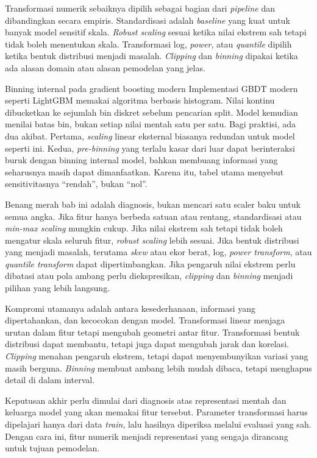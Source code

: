 Transformasi numerik sebaiknya dipilih sebagai bagian dari \emph{pipeline} dan dibandingkan secara empiris. Standardisasi adalah \emph{baseline} yang kuat untuk banyak model sensitif skala. \emph{Robust scaling} sesuai ketika nilai ekstrem sah tetapi tidak boleh menentukan skala. Transformasi log, \emph{power}, atau \emph{quantile} dipilih ketika bentuk distribusi menjadi masalah. \emph{Clipping} dan \emph{binning} dipakai ketika ada alasan domain atau alasan pemodelan yang jelas.

\begin{pendalaman}{Binning internal pada gradient boosting modern}
Implementasi GBDT modern seperti LightGBM memakai algoritma berbasis histogram. Nilai kontinu dibucketkan ke sejumlah bin diskret sebelum pencarian split. Model kemudian menilai batas bin, bukan setiap nilai mentah satu per satu. Bagi praktisi, ada dua akibat. Pertama, \emph{scaling} linear eksternal biasanya redundan untuk model seperti ini. Kedua, \emph{pre-binning} yang terlalu kasar dari luar dapat berinteraksi buruk dengan binning internal model, bahkan membuang informasi yang seharusnya masih dapat dimanfaatkan. Karena itu, tabel utama menyebut sensitivitasnya ``rendah'', bukan ``nol''.
\end{pendalaman}

\begin{sintesis}

Benang merah bab ini adalah diagnosis, bukan mencari satu scaler baku untuk semua angka. Jika fitur hanya berbeda satuan atau rentang, standardisasi atau \emph{min-max scaling} mungkin cukup. Jika nilai ekstrem sah tetapi tidak boleh mengatur skala seluruh fitur, \emph{robust scaling} lebih sesuai. Jika bentuk distribusi yang menjadi masalah, terutama \emph{skew} atau ekor berat, log, \emph{power transform}, atau \emph{quantile transform} dapat dipertimbangkan. Jika pengaruh nilai ekstrem perlu dibatasi atau pola ambang perlu diekspresikan, \emph{clipping} dan \emph{binning} menjadi pilihan yang lebih langsung.

Kompromi utamanya adalah antara kesederhanaan, informasi yang dipertahankan, dan kecocokan dengan model. Transformasi linear menjaga urutan dalam fitur tetapi mengubah geometri antar fitur. Transformasi bentuk distribusi dapat membantu, tetapi juga dapat mengubah jarak dan korelasi. \emph{Clipping} menahan pengaruh ekstrem, tetapi dapat menyembunyikan variasi yang masih berguna. \emph{Binning} membuat ambang lebih mudah dibaca, tetapi menghapus detail di dalam interval.

Keputusan akhir perlu dimulai dari diagnosis atas representasi mentah dan keluarga model yang akan memakai fitur tersebut. Parameter transformasi harus dipelajari hanya dari data \emph{train}, lalu hasilnya diperiksa melalui evaluasi yang sah. Dengan cara ini, fitur numerik menjadi representasi yang sengaja dirancang untuk tujuan pemodelan.

\end{sintesis}

